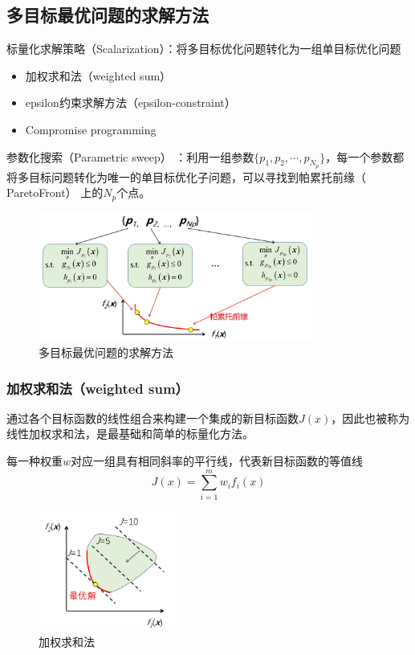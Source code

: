 \subsection{多目标最优问题的求解方法}

标量化求解策略（Scalarization）：将多目标优化问题转化为一组单目标优化问题
\begin{itemize}[itemsep=0pt,parsep=0pt]
    \item 加权求和法（weighted sum）
    \item epsilon约束求解方法（epsilon-constraint）
    \item Compromise programming
\end{itemize}

参数化搜索（Parametric sweep） ：利用一组参数$\{p_1, p_2, \cdots, p_{N_p}\}$，每一个参数都将多目标问题转化为唯一的单目标优化子问题，可以寻找到帕累托前缘（ ParetoFront） 上的$N_p$个点。

\begin{figure}[ht]
    \centering
    \includegraphics[width=0.8\textwidth]{pic/2.7.3.png}
    \caption{多目标最优问题的求解方法}
\end{figure}

\subsubsection{加权求和法（weighted sum）}

通过各个目标函数的线性组合来构建一个集成的新目标函数$J(x)$，因此也被称为线性加权求和法，是最基础和简单的标量化方法。

每一种权重$w$对应一组具有相同斜率的平行线，代表新目标函数的等值线
\begin{equation}
    J(x) = \sum_{i=1}^m w_i f_i(x)
\end{equation}

\begin{figure}[ht]
    \centering
    \includegraphics[width=0.4\textwidth]{pic/2.7.4.png}
    \caption{加权求和法}
\end{figure}

